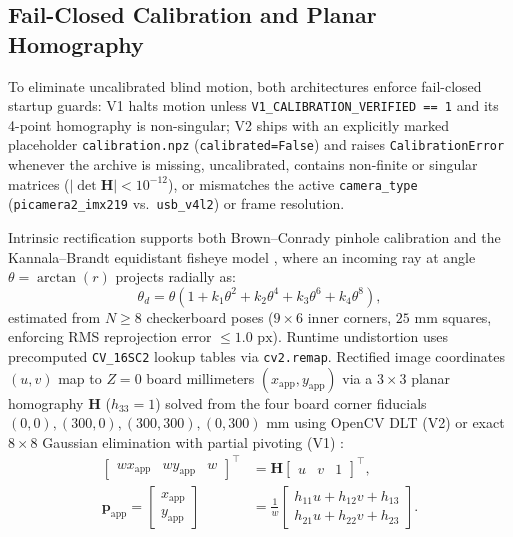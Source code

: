 \documentclass[10pt,twocolumn,letterpaper]{article}
\begin{document}
\subsection{Fail-Closed Calibration and Planar Homography}
To eliminate uncalibrated blind motion, both architectures enforce fail-closed startup guards: V1 halts motion unless \texttt{V1\_CALIBRATION\_VERIFIED == 1} and its 4-point homography is non-singular; V2 ships with an explicitly marked placeholder \texttt{calibration.npz} (\texttt{calibrated=False}) and raises \texttt{CalibrationError} whenever the archive is missing, uncalibrated, contains non-finite or singular matrices ($|\det \mathbf{H}| < 10^{-12}$), or mismatches the active \texttt{camera\_type} (\texttt{picamera2\_imx219} vs.\ \texttt{usb\_v4l2}) or frame resolution.

Intrinsic rectification supports both Brown--Conrady pinhole calibration \cite{zhang2000flexible} and the Kannala--Brandt equidistant fisheye model \cite{kannala2006generic}, where an incoming ray at angle $\theta = \arctan(r)$ projects radially as:
\begin{equation}
  \theta_d = \theta\!\left(1 + k_1\theta^2 + k_2\theta^4 + k_3\theta^6 + k_4\theta^8\right),
  \label{eq:fisheye}
\end{equation}
estimated from $N \ge 8$ checkerboard poses ($9\times 6$ inner corners, $25\text{ mm}$ squares, enforcing RMS reprojection error $\le 1.0\text{ px}$). Runtime undistortion uses precomputed \texttt{CV\_16SC2} lookup tables via \texttt{cv2.remap}. Rectified image coordinates $(u,v)$ map to $Z=0$ board millimeters $(x_{\mathrm{app}}, y_{\mathrm{app}})$ via a $3\times 3$ planar homography $\mathbf{H}$ ($h_{33}=1$) solved from the four board corner fiducials $(0,0), (300,0), (300,300), (0,300)\text{ mm}$ using OpenCV DLT (V2) or exact $8\times 8$ Gaussian elimination with partial pivoting (V1) \cite{hartley2004multiple}:
\begin{equation}
  \begin{aligned}
    \begin{bmatrix} w x_{\mathrm{app}} & w y_{\mathrm{app}} & w \end{bmatrix}^\top &= \mathbf{H} \begin{bmatrix} u & v & 1 \end{bmatrix}^\top, \\
    \mathbf{p}_{\mathrm{app}} = \begin{bmatrix} x_{\mathrm{app}} \\ y_{\mathrm{app}} \end{bmatrix} &= \frac{1}{w}\begin{bmatrix} h_{11}u + h_{12}v + h_{13} \\ h_{21}u + h_{22}v + h_{23} \end{bmatrix}.
  \end{aligned}
  \label{eq:homography}
\end{equation}
\end{document}
